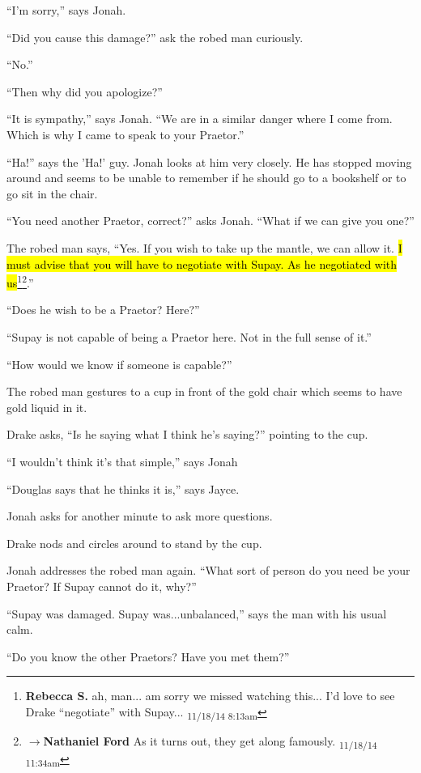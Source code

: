 ``I'm sorry,'' says Jonah.

``Did you cause this damage?'' ask the robed man curiously.

``No.''

``Then why did you apologize?''

``It is sympathy,'' says Jonah.  ``We are in a similar danger where I come from. Which is why I came to speak to your Praetor.''

``Ha!'' says the 'Ha!' guy.  Jonah looks at him very closely.  He has stopped moving around and seems to be unable to remember if he should go to a bookshelf or to go sit in the chair.

``You need another Praetor, correct?'' asks Jonah. ``What if we can give you one?''

The robed man says, ``Yes.  If you wish to take up the mantle, we can allow it.  \hl{I must advise that you will have to negotiate with Supay.  As he negotiated with us}\footnote{\textbf{Rebecca S. }ah, man... am sorry we missed watching this... I'd love to see Drake ``negotiate'' with Supay... \textsubscript{11/18/14 8:13am}}\footnote{$\rightarrow$\textbf{Nathaniel Ford }As it turns out, they get along famously. \textsubscript{11/18/14 11:34am}}.''

``Does he wish to be a Praetor?  Here?''

``Supay is not capable of being a Praetor here.  Not in the full sense of it.''

``How would we know if someone is capable?''

The robed man gestures to a cup in front of the gold chair which seems to have gold liquid in it.

Drake asks, ``Is he saying what I think he's saying?'' pointing to the cup.

``I wouldn't think it's that simple,'' says Jonah

``Douglas says that he thinks it is,'' says Jayce.

Jonah asks for another minute to ask more questions.

Drake nods and circles around to stand by the cup.

Jonah addresses the robed man again. ``What sort of person do you need be your Praetor?  If Supay cannot do it, why?''

``Supay was damaged.  Supay was...unbalanced,'' says the man with his usual calm.

``Do you know the other Praetors?  Have you met them?''

